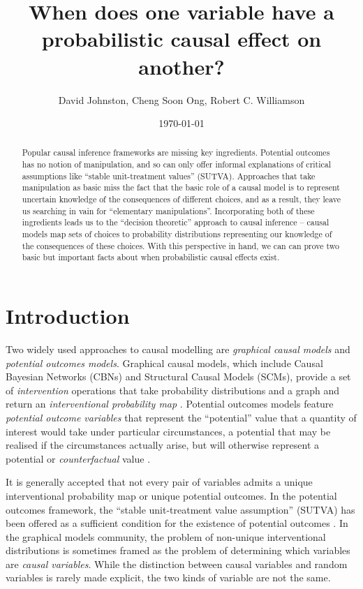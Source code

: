 \documentclass{article}
\title{When does one variable have a probabilistic causal effect on another?}
\date{\today}
\author{ David Johnston, Cheng Soon Ong, Robert C. Williamson }
\theoremstyle{plain}
\theoremstyle{definition}
\begin{document}
\maketitle


\tableofcontents

\begin{abstract}
Popular causal inference frameworks are missing key ingredients. Potential outcomes has no notion of manipulation, and so can only offer informal explanations of critical assumptions like ``stable unit-treatment values'' (SUTVA). Approaches that take manipulation as basic miss the fact that the basic role of a causal model is to represent uncertain knowledge of the consequences of different choices, and as a result, they leave us searching in vain for ``elementary manipulations''. Incorporating both of these ingredients leads us to the ``decision theoretic'' approach to causal inference -- causal models map sets of choices to probability distributions representing our knowledge of the consequences of these choices. With this perspective in hand, we can can prove two basic but important facts about when probabilistic causal effects exist.
\end{abstract}

\section{Introduction}

Two widely used approaches to causal modelling are \emph{graphical causal models} and \emph{potential outcomes models}. Graphical causal models, which include Causal Bayesian Networks (CBNs) and Structural Causal Models (SCMs), provide a set of \emph{intervention} operations that take probability distributions and a graph and return an \emph{interventional probability map} \citep{pearl_causality:_2009}. Potential outcomes models feature \emph{potential outcome variables} that represent the ``potential'' value that a quantity of interest would take under particular circumstances, a potential that may be realised if the circumstances actually arise, but will otherwise represent a potential or \emph{counterfactual} value \citep{rubin_causal_2005}.

It is generally accepted that not every pair of variables admits a unique interventional probability map or unique potential outcomes. In the potential outcomes framework, the ``stable unit-treatment value assumption'' (SUTVA) has been offered as a sufficient condition for the existence of potential outcomes \citet{rubin_causal_2005,imbens_causal_2015}. In the graphical models community, the problem of non-unique interventional distributions is sometimes framed as the problem of determining which variables are \emph{causal variables}. While the distinction between causal variables and random variables is rarely made explicit, the two kinds of variable are not the same.
\end{document}
